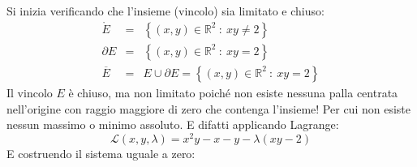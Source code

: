 \documentclass[a4paper]{article}
\begin{document}
	\noindent
	Si inizia verificando che l'insieme (vincolo) sia limitato e chiuso:
	\begin{equation*}
		\begin{array}{rcl}
			\mathring{E} &=& \left\{\left(x,y\right) \in \mathbb{R}^{2} \: : \: xy \ne 2\right\} \\ [.3em]
			\partial E &=& \left\{\left(x,y\right) \in \mathbb{R}^{2} \: : \: xy = 2\right\} \\ [.3em]
			\overline{E} &=& E \cup \partial E = \left\{\left(x,y\right) \in \mathbb{R}^{2} \: : \: xy = 2\right\}
		\end{array}
	\end{equation*}
	Il vincolo $E$ è chiuso, ma non limitato poiché non esiste nessuna palla centrata nell'origine con raggio maggiore di zero che contenga l'insieme! Per cui non esiste nessun massimo o minimo assoluto. E difatti applicando Lagrange:
	\begin{equation*}
		\mathcal{L}\left(x,y,\lambda\right) = x^{2}y - x -y - \lambda\left(xy-2\right)
	\end{equation*}
	E costruendo il sistema uguale a zero:
\end{document}

